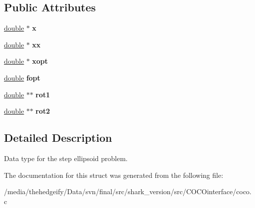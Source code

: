 \subsection*{Public Attributes}
\begin{DoxyCompactItemize}
\item 
\hyperlink{classdouble}{double} $\ast$ {\bfseries x}\hypertarget{structf__step__ellipsoid__data__t_a44de413e6bbf7d0c643a5fa7144f58ec}{}\label{structf__step__ellipsoid__data__t_a44de413e6bbf7d0c643a5fa7144f58ec}

\item 
\hyperlink{classdouble}{double} $\ast$ {\bfseries xx}\hypertarget{structf__step__ellipsoid__data__t_ad3ff269e0d5ee036a0aa36705bcb86f7}{}\label{structf__step__ellipsoid__data__t_ad3ff269e0d5ee036a0aa36705bcb86f7}

\item 
\hyperlink{classdouble}{double} $\ast$ {\bfseries xopt}\hypertarget{structf__step__ellipsoid__data__t_aa5e100c3aa2a49278018d945f0701fa8}{}\label{structf__step__ellipsoid__data__t_aa5e100c3aa2a49278018d945f0701fa8}

\item 
\hyperlink{classdouble}{double} {\bfseries fopt}\hypertarget{structf__step__ellipsoid__data__t_a38ad621131dd84883bb17b26ac52e2a1}{}\label{structf__step__ellipsoid__data__t_a38ad621131dd84883bb17b26ac52e2a1}

\item 
\hyperlink{classdouble}{double} $\ast$$\ast$ {\bfseries rot1}\hypertarget{structf__step__ellipsoid__data__t_afe723ff624e3219444e0f364e52e186a}{}\label{structf__step__ellipsoid__data__t_afe723ff624e3219444e0f364e52e186a}

\item 
\hyperlink{classdouble}{double} $\ast$$\ast$ {\bfseries rot2}\hypertarget{structf__step__ellipsoid__data__t_a090ddc797dff1d608384bbbdf7868192}{}\label{structf__step__ellipsoid__data__t_a090ddc797dff1d608384bbbdf7868192}

\end{DoxyCompactItemize}


\subsection{Detailed Description}
Data type for the step ellipsoid problem. 

The documentation for this struct was generated from the following file\+:\begin{DoxyCompactItemize}
\item 
/media/thehedgeify/\+Data/svn/final/src/shark\+\_\+version/src/\+C\+O\+C\+Ointerface/coco.\+c\end{DoxyCompactItemize}
